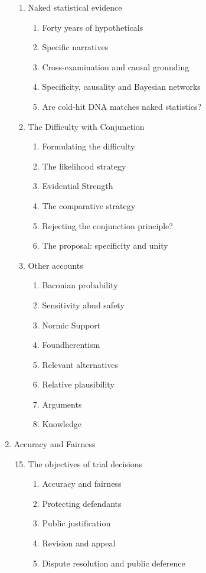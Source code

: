 \documentclass[
  10pt,
  dvipsnames,enabledeprecatedfontcommands]{scrartcl}
\begin{document}
\begin{multicols}{2}
\begin{enumerate}
\begin{enumerate}
\item  Naked statistical evidence
  \begin{enumerate}
  \item  Forty years of hypotheticals
  \item  Specific narratives
  \item  Cross-examination and causal grounding
  \item  Specificity, causality and Bayesian networks 
  \item  Are cold-hit DNA matches naked statistics?
  \end{enumerate}
  
  
\item  The Difficulty with Conjunction
  \begin{enumerate}
  \item  Formulating the difficulty

  \item  The likelihood strategy
  \item  Evidential Strength
  \item  The comparative strategy
  \item  Rejecting the conjunction principle?
  \item  The proposal: specificity and unity 
  \end{enumerate}  

 \item  Other accounts 
  \begin{enumerate}
  \item  Baconian probability
  \item  Sensitivity abnd safety
  \item  Normic Support
  \item  Foundherentism
  \item  Relevant alternatives
  \item  Relative plausibility
  \item  Arguments
  \item  Knowledge
  \end{enumerate}

\end{enumerate}
\item  Accuracy and Fairness
\begin{enumerate}

\setcounter{enumii}{14}
  \item  The objectives of trial decisions
  \begin{enumerate}
  \item  Accuracy and fairness 
  \item  Protecting defendants
  \item  Public justification 
  \item  Revision and appeal
  \item  Dispute resolution and public deference
  \end{enumerate}





\end{enumerate}
\end{enumerate}
\end{multicols}
\end{document}
